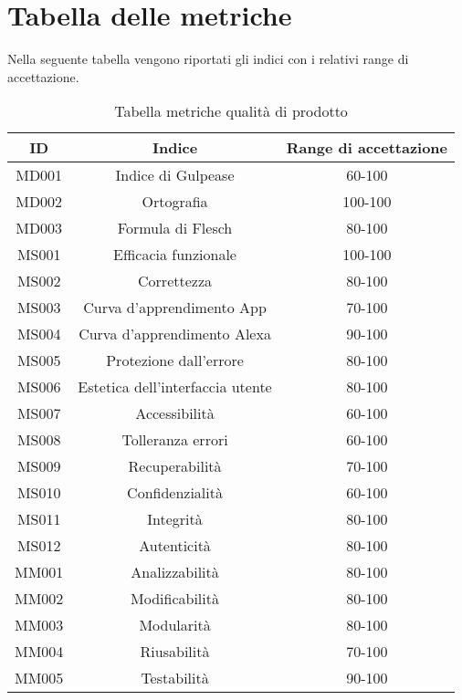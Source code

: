 \section{Tabella delle metriche}
Nella seguente tabella vengono riportati gli indici con i relativi range di accettazione.\\
\begin{table}[h]
    \begin{center}
      \begin{tabular}{|c|c|c|}
        \hline
        \textbf{ID} & \textbf{Indice}       & \textbf{Range di accettazione}\\
        \hline
        MD001       & Indice di Gulpease    & 60-100\\
        MD002       & Ortografia            & 100-100\\
        MD003       & Formula di Flesch     & 80-100\\\hline
        MS001       & Efficacia funzionale  & 100-100\\
        MS002       & Correttezza  			& 80-100\\
        MS003       & Curva d'apprendimento App & 70-100\\
        MS004       & Curva d'apprendimento Alexa   & 90-100\\
        MS005       & Protezione dall'errore  & 80-100\\
        MS006       & Estetica dell'interfaccia utente  & 80-100\\
        MS007       & Accessibilità			  & 60-100\\
        MS008       & Tolleranza errori    & 60-100\\
        MS009       & Recuperabilità			& 70-100\\
        MS010       & Confidenzialità 	 	& 60-100\\
        MS011       & Integrità  			& 80-100\\
        MS012       & Autenticità		    & 80-100\\\hline
        MM001       & Analizzabilità	    & 80-100\\
        MM002       & Modificabilità		& 80-100\\
        MM003       & Modularità		    & 80-100\\
        MM004       & Riusabilità			& 70-100\\
		MM005       & Testabilità			& 90-100\\
        \hline
      \end{tabular}
      \caption{Tabella metriche qualità di prodotto}
    \end{center}
\end{table}